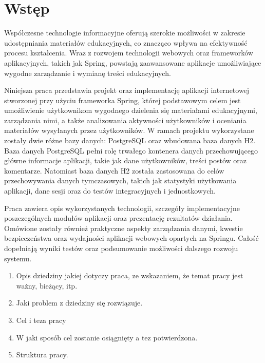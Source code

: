 %


\chapter*{Wstęp}

Współczesne technologie informacyjne oferują szerokie możliwości w zakresie udostępniania materiałów edukacyjnych, co znacząco wpływa na efektywność procesu kształcenia. Wraz z rozwojem technologii webowych oraz frameworków aplikacyjnych, takich jak Spring, powstają zaawansowane aplikacje umożliwiające wygodne zarządzanie i wymianę treści edukacyjnych.

Niniejsza praca przedstawia projekt oraz implementację aplikacji internetowej stworzonej przy użyciu frameworka Spring, której podstawowym celem jest umożliwienie użytkownikom wygodnego dzielenia się materiałami edukacyjnymi, zarządzania nimi, a także analizowania aktywności użytkowników i oceniania materiałów wysyłanych przez użytkowników. W ramach projektu wykorzystane zostały dwie różne bazy danych: PostgreSQL oraz wbudowana baza danych H2. Baza danych PostgreSQL pełni rolę trwałego kontenera danych przechowującego główne informacje aplikacji, takie jak dane użytkowników, treści postów oraz komentarze. Natomiast baza danych H2 została zastosowana do celów przechowywania danych tymczasowych, takich jak statystyki użytkowania aplikacji, dane sesji oraz do testów integracyjnych i jednostkowych.

Praca zawiera opis wykorzystanych technologii, szczegóły implementacyjne poszczególnych modułów aplikacji oraz prezentację rezultatów działania. Omówione zostały również praktyczne aspekty zarządzania danymi, kwestie bezpieczeństwa oraz wydajności aplikacji webowych opartych na Springu. Całość dopełniają wyniki testów oraz podsumowanie możliwości dalszego rozwoju systemu.


\begin{enumerate}
\item Opis dziedziny jakiej dotyczy praca, ze wskazaniem, że temat pracy jest ważny, bieżący, itp.
\item Jaki problem z dziedziny się rozwiązuje.
\item Cel i teza pracy
\item W jaki sposób cel zostanie osiągnięty a tez potwierdzona.
\item Struktura pracy.
\end{enumerate} 